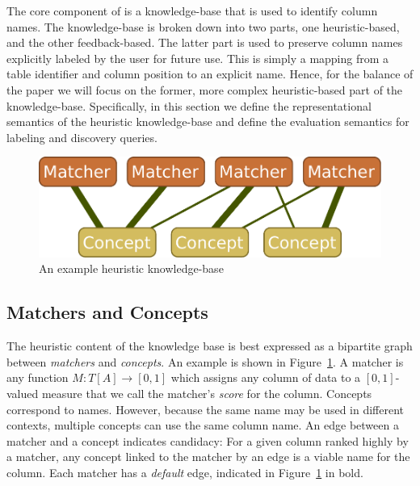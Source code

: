 

The core component of \systemname is a knowledge-base that is used to identify column names.
The knowledge-base is broken down into two parts, one heuristic-based, and the other feedback-based.
The latter part is used to preserve column names explicitly labeled by the user for future use.  
This is simply a mapping from a table identifier and column position to an explicit name.  
Hence, for the balance of the paper we will focus on the former, more complex heuristic-based part of the \systemname knowledge-base.
Specifically, in this section we define the representational semantics of the heuristic knowledge-base and define the evaluation semantics for labeling and discovery queries.


\begin{figure}
\centering
\includegraphics[width=0.8\columnwidth]{graphics/knowledgebase}
\caption{An example \systemname heuristic knowledge-base}
\label{fig:bipartitekb}
\end{figure}

\subsection{Matchers and Concepts}

The heuristic content of the knowledge base is best expressed as a bipartite graph between \emph{matchers} and \emph{concepts}.
An example is shown in Figure~\ref{fig:bipartitekb}.  
A matcher is any function $M : T[A] \rightarrow [0,1]$ which assigns any column of data to a $[0,1]$-valued measure that we call the matcher's \emph{score} for the column.  
Concepts correspond to names.
However, because the same name may be used in different contexts, multiple concepts can use the same column name.
An edge between a matcher and a concept indicates candidacy:
For a given column ranked highly by a matcher, any concept linked to the matcher by an edge is a viable name for the column.
Each matcher has a \emph{default} edge, indicated in Figure~\ref{fig:bipartitekb} in bold.

